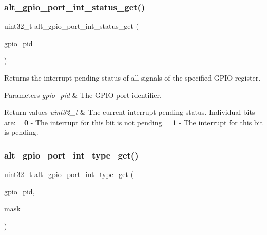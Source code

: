 \subsubsection{\texorpdfstring{alt\_gpio\_port\_int\_status\_get()}{alt\_gpio\_port\_int\_status\_get()}}
{\footnotesize\ttfamily uint32\+\_\+t alt\+\_\+gpio\+\_\+port\+\_\+int\+\_\+status\+\_\+get (\begin{DoxyParamCaption}\item[{\mbox{\hyperlink{group__ALT__GPIO__API__CONFIG_gaaf1cf0e2a720d20cd883810f2b59097e}{A\+L\+T\+\_\+\+G\+P\+I\+O\+\_\+\+P\+O\+R\+T\+\_\+t}}}]{gpio\+\_\+pid }\end{DoxyParamCaption})}

Returns the interrupt pending status of all signals of the specified G\+P\+IO register.


\begin{DoxyParams}{Parameters}
{\em gpio\+\_\+pid} & The G\+P\+IO port identifier.\\
\hline
\end{DoxyParams}

\begin{DoxyRetVals}{Return values}
{\em uint32\+\_\+t} & The current interrupt pending status. Individual bits are\+: ~\newline
 {\bfseries{0}} -\/ The interrupt for this bit is not pending. ~\newline
 {\bfseries{1}} -\/ The interrupt for this bit is pending. \\
\hline
\end{DoxyRetVals}
\mbox{\label{group__ALT__GPIO__INT_ga865bcf59622842a164eb2110a63e3fa5}} 
\subsubsection{\texorpdfstring{alt\_gpio\_port\_int\_type\_get()}{alt\_gpio\_port\_int\_type\_get()}}
{\footnotesize\ttfamily uint32\+\_\+t alt\+\_\+gpio\+\_\+port\+\_\+int\+\_\+type\+\_\+get (\begin{DoxyParamCaption}\item[{\mbox{\hyperlink{group__ALT__GPIO__API__CONFIG_gaaf1cf0e2a720d20cd883810f2b59097e}{A\+L\+T\+\_\+\+G\+P\+I\+O\+\_\+\+P\+O\+R\+T\+\_\+t}}}]{gpio\+\_\+pid,  }\item[{uint32\+\_\+t}]{mask }\end{DoxyParamCaption})}

